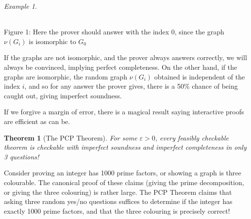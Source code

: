 \documentclass{article}
\theoremstyle{plain}
\newtheorem{theorem}{Theorem}
\theoremstyle{remark}
\newtheorem*{example}{Example}
\theoremstyle{definition}
\begin{document}
\begin{multicols}{2}
\begin{example}
\begin{center}
\\
{\small Figure 1: Here the prover should answer with the index 0, since the graph $\nu(G_i)$ is isomorphic to $G_0$}
\end{center}

If the graphs are not isomorphic, and the prover always answers correctly, we will always be convinced, implying perfect completeness. On the other hand, if the graphs are isomorphic, the random graph $\nu(G_i)$ obtained is independent of the index $i$, and so for any answer the prover gives, there is a 50\% chance of being caught out, giving imperfect soundness.
\end{example}

If we forgive a margin of error, there is a magical result saying interactive proofs are efficient as can be.

\begin{theorem}[The PCP Theorem]
    For some $\varepsilon > 0$, every feasibly checkable theorem is checkable with imperfect soundness and imperfect completeness in only 3 questions!
\end{theorem}

Consider proving an integer has 1000 prime factors, or showing a graph is three colourable. The canonical proof of these claims (giving the prime decomposition, or giving the three colouring) is rather large. The PCP Theorem claims that asking three random yes/no questions suffices to determine if the integer has exactly 1000 prime factors, and that the three colouring is precisely correct!

\begin{center}
\end{center}
\end{multicols}
\end{document}
